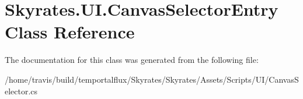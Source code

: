 \hypertarget{class_skyrates_1_1_u_i_1_1_canvas_selector_entry}{\section{Skyrates.\-U\-I.\-Canvas\-Selector\-Entry Class Reference}
\label{class_skyrates_1_1_u_i_1_1_canvas_selector_entry}
}


The documentation for this class was generated from the following file\-:\begin{DoxyCompactItemize}
\item 
/home/travis/build/temportalflux/\-Skyrates/\-Skyrates/\-Assets/\-Scripts/\-U\-I/Canvas\-Selector.\-cs\end{DoxyCompactItemize}
